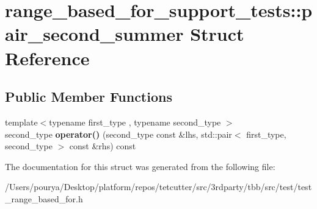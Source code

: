 \hypertarget{structrange__based__for__support__tests_1_1pair__second__summer}{}\section{range\+\_\+based\+\_\+for\+\_\+support\+\_\+tests\+:\+:pair\+\_\+second\+\_\+summer Struct Reference}
\label{structrange__based__for__support__tests_1_1pair__second__summer}
\subsection*{Public Member Functions}
\begin{DoxyCompactItemize}
\item 
\hypertarget{structrange__based__for__support__tests_1_1pair__second__summer_a22fe8ebb5d3c330288976ddf5b540999}{}{\footnotesize template$<$typename first\+\_\+type , typename second\+\_\+type $>$ }\\second\+\_\+type {\bfseries operator()} (second\+\_\+type const \&lhs, std\+::pair$<$ first\+\_\+type, second\+\_\+type $>$ const \&rhs) const \label{structrange__based__for__support__tests_1_1pair__second__summer_a22fe8ebb5d3c330288976ddf5b540999}

\end{DoxyCompactItemize}


The documentation for this struct was generated from the following file\+:\begin{DoxyCompactItemize}
\item 
/\+Users/pourya/\+Desktop/platform/repos/tetcutter/src/3rdparty/tbb/src/test/test\+\_\+range\+\_\+based\+\_\+for.\+h\end{DoxyCompactItemize}
